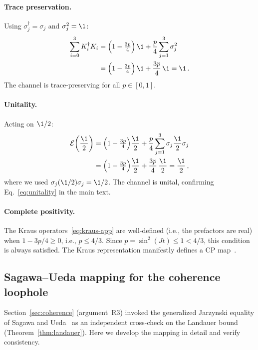 \paragraph{Trace preservation.}
Using $\sigma_j^\dagger = \sigma_j$ and $\sigma_j^2 = \1$:
\begin{align}
  \sum_{i=0}^{3} K_i^\dagger K_i
  &= \Bigl(1 - \tfrac{3p}{4}\Bigr)\,\1
    + \frac{p}{4}\sum_{j=1}^{3}\sigma_j^2
  \notag\\
  &= \Bigl(1 - \tfrac{3p}{4}\Bigr)\,\1
    + \frac{3p}{4}\,\1
  = \1 \,.
  \label{eq:tp-check}
\end{align}
The channel is trace-preserving for all $p \in [0,1]$.

\paragraph{Unitality.}
Acting on $\1/2$:
\begin{align}
  \mathcal{E}\!\left(\frac{\1}{2}\right)
  &= \Bigl(1 - \tfrac{3p}{4}\Bigr)\frac{\1}{2}
    + \frac{p}{4}\sum_{j=1}^{3}\sigma_j\frac{\1}{2}\sigma_j
  \notag\\
  &= \Bigl(1 - \tfrac{3p}{4}\Bigr)\frac{\1}{2}
    + \frac{3p}{4}\,\frac{\1}{2}
  = \frac{\1}{2} \,,
  \label{eq:unital-check}
\end{align}
where we used $\sigma_j(\1/2)\sigma_j = \1/2$.  The channel is
unital, confirming Eq.~\eqref{eq:unitality} in the main text.

\paragraph{Complete positivity.}
The Kraus operators~\eqref{eq:kraus-app} are well-defined (i.e., the
prefactors are real) when $1 - 3p/4 \geq 0$, i.e., $p \leq 4/3$.
Since $p = \sin^2(Jt) \leq 1 < 4/3$, this condition is always
satisfied.  The Kraus representation manifestly defines a CP
map~\cite{Lindblad1975}.

\subsection{Sagawa--Ueda mapping for the coherence
  loophole}\label{app:sagawa-ueda}

Section~\ref{sec:coherence} (argument~R3) invoked the generalized
Jarzynski equality of Sagawa and Ueda~\cite{SagawaUeda2010} as an
independent cross-check on the Landauer bound
(Theorem~\ref{thm:landauer}).  Here we develop the mapping in detail
and verify consistency.

